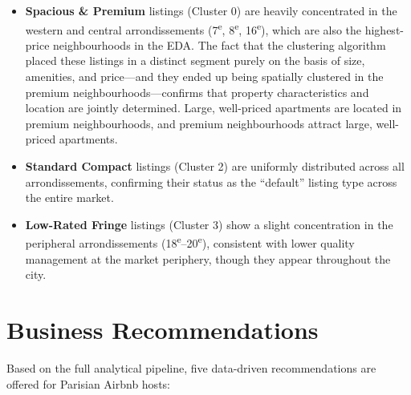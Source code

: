 \documentclass[12pt, a4paper]{article}
\begin{document}
\begin{itemize}[itemsep=4pt]
  \item \textbf{Spacious \& Premium} listings (Cluster 0) are heavily concentrated in the western and central arrondissements (7\textsuperscript{e}, 8\textsuperscript{e}, 16\textsuperscript{e}), which are also the highest-price neighbourhoods in the EDA. The fact that the clustering algorithm placed these listings in a distinct segment purely on the basis of size, amenities, and price---and they ended up being spatially clustered in the premium neighbourhoods---confirms that property characteristics and location are jointly determined. Large, well-priced apartments are located in premium neighbourhoods, and premium neighbourhoods attract large, well-priced apartments.

  \item \textbf{Standard Compact} listings (Cluster 2) are uniformly distributed across all arrondissements, confirming their status as the ``default'' listing type across the entire market.

  \item \textbf{Low-Rated Fringe} listings (Cluster 3) show a slight concentration in the peripheral arrondissements (18\textsuperscript{e}--20\textsuperscript{e}), consistent with lower quality management at the market periphery, though they appear throughout the city.
\end{itemize}

\section{Business Recommendations}
\label{sec:recommendations}

Based on the full analytical pipeline, five data-driven recommendations are offered for Parisian Airbnb hosts:
\end{document}
